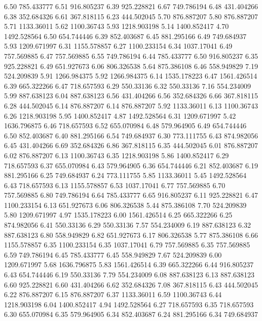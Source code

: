 6.50 	785.433777
6.51 	916.805237
6.39 	925.228821
6.67 	749.786194
6.48 	431.404266
6.38 	352.684326
6.61 	367.818115
6.23 	444.502045
5.70 	876.887207
5.80 	876.887207
5.71 	1133.36011
5.62 	1100.36743
5.93 	1218.903198
5.14 	1400.852417
4.70 	1492.528564
6.50 	654.744446
6.39 	852.403687
6.45 	881.295166
6.49 	749.684937
5.93 	1209.671997
6.31 	1155.578857
6.27 	1100.233154
6.34 	1037.17041
6.49 	757.569885
6.47 	757.569885
6.55 	749.786194
6.44 	785.433777
6.50 	916.805237
6.35 	925.228821
6.49 	651.927673
6.06 	806.326538
5.64 	875.386108
6.46 	558.949829
7.19 	524.209839
5.91 	1266.984375
5.92 	1266.984375
6.14 	1535.178223
6.47 	1561.426514
6.39 	665.322266
6.47 	718.657593
6.29 	550.33136
6.32 	550.33136
7.16 	554.234009
5.99 	887.638123
6.04 	887.638123
6.56 	431.404266
6.56 	352.684326
6.66 	367.818115
6.28 	444.502045
6.14 	876.887207
6.14 	876.887207
5.92 	1133.36011
6.13 	1100.36743
6.26 	1218.903198
5.95 	1400.852417
4.87 	1492.528564
6.31 	1209.671997
5.42 	1636.796875
6.46 	718.657593
6.52 	655.070984
6.48 	579.964905
6.49 	654.744446
6.50 	852.403687
6.40 	881.295166
6.54 	749.684937
6.30 	773.111755
6.43 	874.982056
6.45 	431.404266
6.69 	352.684326
6.86 	367.818115
6.35 	444.502045
6.01 	876.887207
6.02 	876.887207
6.13 	1100.36743
6.35 	1218.903198
5.86 	1400.852417
6.29 	718.657593
6.37 	655.070984
6.43 	579.964905
6.36 	654.744446
6.21 	852.403687
6.19 	881.295166
6.25 	749.684937
6.24 	773.111755
5.85 	1133.36011
5.45 	1492.528564
6.43 	718.657593
6.13 	1155.578857
6.53 	1037.17041
6.77 	757.569885
6.70 	757.569885
6.80 	749.786194
6.64 	785.433777
6.65 	916.805237
6.11 	925.228821
6.47 	1100.233154
6.13 	651.927673
6.06 	806.326538
5.44 	875.386108
7.70 	524.209839
5.80 	1209.671997
4.97 	1535.178223
6.00 	1561.426514
6.25 	665.322266
6.25 	874.982056
6.41 	550.33136
6.29 	550.33136
7.57 	554.234009
6.19 	887.638123
6.32 	887.638123
6.80 	558.949829
6.82 	651.927673
6.17 	806.326538
5.77 	875.386108
6.66 	1155.578857
6.35 	1100.233154
6.35 	1037.17041
6.79 	757.569885
6.35 	757.569885
6.59 	749.786194
6.45 	785.433777
6.45 	558.949829
7.67 	524.209839
6.00 	1209.671997
5.68 	1636.796875
5.83 	1561.426514
6.39 	665.322266
6.44 	916.805237
6.43 	654.744446
6.19 	550.33136
7.79 	554.234009
6.08 	887.638123
6.13 	887.638123
6.60 	925.228821
6.60 	431.404266
6.62 	352.684326
7.08 	367.818115
6.43 	444.502045
6.22 	876.887207
6.15 	876.887207
6.37 	1133.36011
6.59 	1100.36743
6.44 	1218.903198
6.04 	1400.852417
4.94 	1492.528564
6.27 	718.657593
6.35 	718.657593
6.30 	655.070984
6.35 	579.964905
6.34 	852.403687
6.24 	881.295166
6.34 	749.684937
